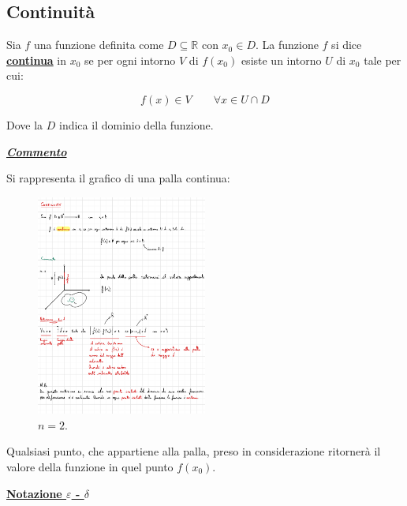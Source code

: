 \documentclass[a4paper]{article}
\begin{document}
	\subsection{Continuità}
	
	Sia $f$ una funzione definita come $D \subseteq \mathbb{R}$ con $x_{0} \in D$. La funzione $f$ si dice \textcolor{Red3}{\textbf{\underline{continua}}} in $x_{0}$ se per ogni intorno $V$ di $f\left(x_{0}\right)$ esiste un intorno $U$ di $x_{0}$ tale per cui:
	
	\begin{equation*}
		f\left(x\right) \in V \hspace{2em} \forall x \in U \cap D
	\end{equation*}

	\noindent
	Dove la $D$ indica il dominio della funzione.\newline
	
	\noindent
	\textcolor{Green4}{\textbf{\emph{\underline{Commento}}}}\newline
	
	\noindent
	Si rappresenta il grafico di una palla continua:
	
	\begin{figure}[!htp]
		\centering
		\includegraphics[width=0.5\textwidth]{img/continuita.pdf}
		\caption{$n = 2$.}
	\end{figure}
	
	\noindent
	Qualsiasi punto, che appartiene alla palla, preso in considerazione ritornerà il valore della funzione in quel punto $f\left(x_{0}\right)$.\newline
	
	\noindent
	\textcolor{Red3}{\textbf{\underline{Notazione $\varepsilon$ - $\delta$}}}\newline
	
\end{document}
